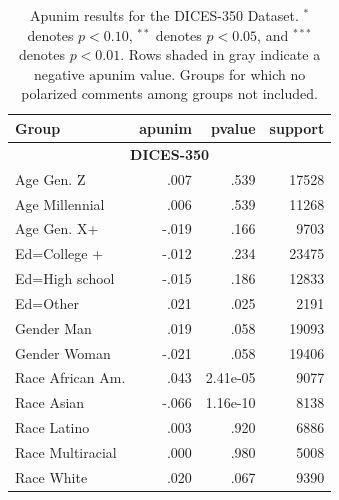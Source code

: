 \documentclass[11pt]{article}
\theoremstyle{definition}
\theoremstyle{plain}
\begin{document}
\begin{table}[t]
	\centering
	\small 
	\begin{tabularx}{\columnwidth}{X r r r}
		\toprule
		\textbf{Group} & \textbf{apunim} & \textbf{pvalue} & \textbf{support} \\
		\midrule
		
		\multicolumn{4}{c}{\textbf{DICES-350}} \\
		\midrule
		
		Age Gen. Z & .007 & .539 & 17528 \\
		Age Millennial & .006 & .539 & 11268 \\
		\rowcolor{gray!15}
		Age Gen. X+ & -.019 & .166 & 9703 \\
		\rowcolor{gray!15}
		Ed=College + & -.012 & .234 & 23475 \\
		\rowcolor{gray!15}
		Ed=High school & -.015 & .186 & 12833 \\
		Ed=Other & .021 & .025 & 2191 \\
		Gender Man & .019 & .058 & 19093 \\
		\rowcolor{gray!15}
		Gender Woman & -.021 & .058 & 19406 \\
		Race African Am. & .043 & 2.41e-05 & 9077 \\
		\rowcolor{gray!15}
		Race Asian & -.066 & 1.16e-10 & 8138 \\
		Race Latino & .003 & .920 & 6886 \\
		Race Multiracial & .000 & .980 & 5008 \\
		Race White & .020 & .067 & 9390 \\
		\bottomrule
	\end{tabularx}
	\caption{Apunim results for the DICES-350 Dataset. $^{*}$ denotes $p<0.10$, $^{**}$ denotes $p<0.05$, and $^{***}$ denotes $p<0.01$.  Rows shaded in gray indicate a negative $\text{apunim}$ value. Groups for which no polarized comments among groups not included.}
	\label{tab:dices350-full}
\end{table}
\end{document}
